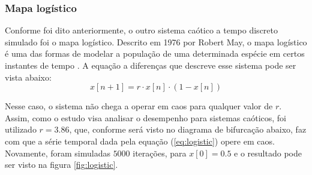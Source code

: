 \documentclass{article}
\begin{document}
\subsubsection{Mapa logístico}

Conforme foi dito anteriormente, o outro sistema caótico a tempo discreto simulado foi o mapa logístico. Descrito em 1976 por Robert May, o mapa logístico é uma das formas de modelar a população de uma determinada espécie em certos instantes de tempo \cite{may1976simple}. A equação a diferenças que descreve esse sistema pode ser vista abaixo:
\begin{equation}\label{eq:logistic}
x[n+1] = r\cdot x[n] \cdot (1 - x[n])
\end{equation}

Nesse caso, o sistema não chega a operar em caos para qualquer valor de $r$. Assim, como o estudo visa analisar o desempenho para sistemas caóticos, foi utilizado $r=3.86$, que, conforme será visto no diagrama de bifurcação abaixo, faz com que a série temporal dada pela equação (\ref{eq:logistic}) opere em caos. Novamente, foram simuladas $5000$ iterações, para $x[0] = 0.5$ e o resultado pode ser visto na figura \ref{fig:logistic}.
\end{document}
